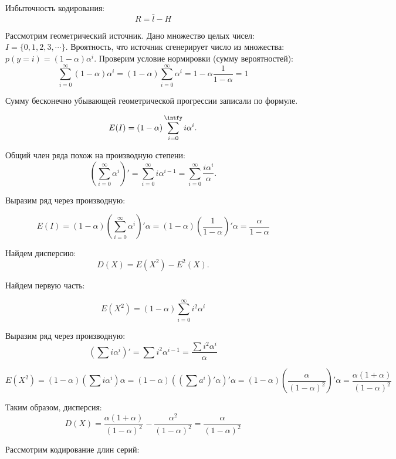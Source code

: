 Избыточность кодирования:
\[
    R = \bar l - H
\]

Рассмотрим геометрический источник. Дано множество целых чисел: $I = \{0, 1, 2, 3, \cdots \}$. Вроятность, что
источник сгенерирует число из множества: $p(y=i)=(1 - \alpha)\alpha^i$.
Проверим условие нормировки (сумму вероятностей):
\[
    \sum_{i=0}^\infty (1 - \alpha)\alpha^i = (1-\alpha) \sum_{i=0}^\infty
    \alpha^i = 1-\alpha \frac{1}{1 - \alpha} = 1
\]

Сумму бесконечно убывающей геометрической прогрессии записали по формуле.

\[
    E(I) = (1 - \alpha) \sum_{i=0}^{\intfy} i \alpha^i.
\]

Общий член ряда похож на производную степени: 
\[
    (\sum_{i=0}^\infty \alpha^i)' = \sum_{i=0}^\infty i
\alpha^{i-1} = \sum_{i=0}^\infty \frac{i \alpha^i}{\alpha}.
\] 

Выразим ряд через производную:

\[
    E(I) = (1 - \alpha) \left( \sum_{i=0}^\infty \alpha^i \right)' \alpha = (1-\alpha)
    \left( \frac{1}{1 - \alpha} \right)' \alpha = \frac{\alpha}{1 - \alpha}
\]

Найдем дисперсию:
\[
    D(X) = E(X^2) - E^2(X).
\]

Найдем первую часть:

\[
    E(X^2) = (1 - \alpha) \sum_{i=0}^\infty i^2 \alpha^i
\]

Выразим ряд через производную:
\[
    \left( \sum i \alpha^i \right)' = \sum i^2 \alpha^{i-1} = \frac{\sum i^2
    \alpha^i}{\alpha}
\]

\[
    E(X^2) = (1 - \alpha) \left(\sum i \alpha^i \right) \alpha = ( 1 - \alpha )
    \left( \left( \sum a^i \right)' \alpha \right)' \alpha = (1 - \alpha) \left( \frac{\alpha}{(1 -
    \alpha)^2} \right)' \alpha = \frac{\alpha (1 + \alpha)}{(1 -
\alpha)^2}
\]

Таким образом, дисперсия:
\[
    D(X) = \frac{\alpha (1 + \alpha)}{(1 - \alpha)^2} - \frac{\alpha^2}{(1 -
    \alpha)^2} = \frac{\alpha}{(1 - \alpha)^2}
\]

Рассмотрим кодирование длин серий:

